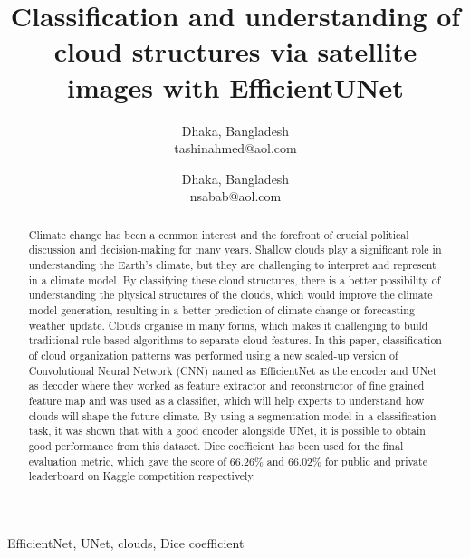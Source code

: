 \documentclass[conference]{IEEEtran}
\begin{document}
\title{Classification and understanding of cloud structures via satellite images with EfficientUNet\\
}

\author{
Dhaka, Bangladesh \\
tashinahmed@aol.com
\and
{}
Dhaka, Bangladesh \\
nsabab@aol.com
}

\maketitle

\begin{abstract}

Climate change has been a common interest and the forefront of crucial political discussion and decision-making for many years. Shallow clouds play a significant role in understanding the Earth's climate, but they are challenging to interpret and represent in a climate model. By classifying these cloud structures, there is a better possibility of understanding the physical structures of the clouds, which would improve the climate model generation, resulting in a better prediction of climate change or forecasting weather update. Clouds organise in many forms, which makes it challenging to build traditional rule-based algorithms to separate cloud features. In this paper, classification of cloud organization patterns was performed using a new scaled-up version of Convolutional Neural Network (CNN) named as EfficientNet as the encoder and UNet as decoder where they worked as feature extractor and reconstructor of fine grained feature map and was used as a classifier, which will help experts to understand how clouds will shape the future climate. By using a segmentation model in a classification task, it was shown that with a good encoder alongside UNet, it is possible to obtain good performance from this dataset. Dice coefficient has been used for the final evaluation metric, which gave the score of 66.26\% and 66.02\% for public and private leaderboard on Kaggle competition respectively.

\end{abstract}

\begin{IEEEkeywords}
EfficientNet, UNet, clouds, Dice coefficient
\end{IEEEkeywords}
\end{document}
